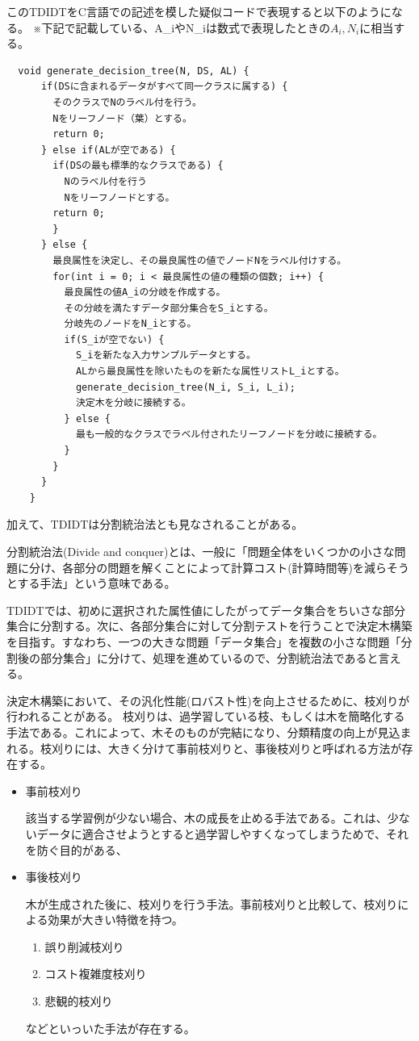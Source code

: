 \documentclass[dvipdfmx]{jsarticle}
\begin{document}
このTDIDTをC言語での記述を模した疑似コードで表現すると以下のようになる。
※下記で記載している、A\_iやN\_iは数式で表現したときの$A_{i}, N_{i}$に相当する。
\begin{verbatim}
  void generate_decision_tree(N, DS, AL) {
      if(DSに含まれるデータがすべて同一クラスに属する) {
        そのクラスでNのラベル付を行う。
        Nをリーフノード（葉）とする。
        return 0;
      } else if(ALが空である) {
        if(DSの最も標準的なクラスである) {
          Nのラベル付を行う
          Nをリーフノードとする。
        return 0;
        }
      } else {
        最良属性を決定し、その最良属性の値でノードNをラベル付けする。
        for(int i = 0; i < 最良属性の値の種類の個数; i++) {
          最良属性の値A_iの分岐を作成する。
          その分岐を満たすデータ部分集合をS_iとする。
          分岐先のノードをN_iとする。
          if(S_iが空でない) {
            S_iを新たな入力サンプルデータとする。
            ALから最良属性を除いたものを新たな属性リストL_iとする。
            generate_decision_tree(N_i, S_i, L_i);
            決定木を分岐に接続する。
          } else {
            最も一般的なクラスでラベル付されたリーフノードを分岐に接続する。
          }
        }
      }
    }
\end{verbatim}
加えて、TDIDTは分割統治法とも見なされることがある。\par
分割統治法(Divide and conquer)とは、一般に「問題全体をいくつかの小さな問題に分け、各部分の問題を解くことによって計算コスト(計算時間等)を減らそうとする手法」という意味である。\par
TDIDTでは、初めに選択された属性値にしたがってデータ集合をちいさな部分集合に分割する。次に、各部分集合に対して分割テストを行うことで決定木構築を目指す。すなわち、一つの大きな問題「データ集合」を複数の小さな問題「分割後の部分集合」に分けて、処理を進めているので、分割統治法であると言える。\par
決定木構築において、その汎化性能(ロバスト性)を向上させるために、枝刈りが行われることがある。
枝刈りは、過学習している枝、もしくは木を簡略化する手法である。これによって、木そのものが完結になり、分類精度の向上が見込まれる。枝刈りには、大きく分けて事前枝刈りと、事後枝刈りと呼ばれる方法が存在する。
\begin{itemize}
  \item 事前枝刈り\par
  該当する学習例が少ない場合、木の成長を止める手法である。これは、少ないデータに適合させようとすると過学習しやすくなってしまうためで、それを防ぐ目的がある、
  \item 事後枝刈り\par
  木が生成された後に、枝刈りを行う手法。事前枝刈りと比較して、枝刈りによる効果が大きい特徴を持つ。
  \begin{enumerate}
    \item 誤り削減枝刈り
    \item コスト複雑度枝刈り
    \item 悲観的枝刈り
  \end{enumerate}
  などといっいた手法が存在する。
\end{itemize}
\end{document}
